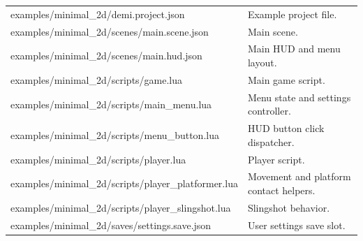 \begin{longtable}{>{\ttfamily\small\raggedright\arraybackslash}p{}p{}}
examples/minimal\_2d/demi.project.json & Example project file. \\
examples/minimal\_2d/scenes/main.scene.json & Main scene. \\
examples/minimal\_2d/scenes/main.hud.json & Main HUD and menu layout. \\
examples/minimal\_2d/scripts/game.lua & Main game script. \\
examples/minimal\_2d/scripts/main\_menu.lua & Menu state and settings controller. \\
examples/minimal\_2d/scripts/menu\_button.lua & HUD button click dispatcher. \\
examples/minimal\_2d/scripts/player.lua & Player script. \\
examples/minimal\_2d/scripts/player\_platformer.lua & Movement and platform contact helpers. \\
examples/minimal\_2d/scripts/player\_slingshot.lua & Slingshot behavior. \\
examples/minimal\_2d/saves/settings.save.json & User settings save slot. \\
\end{longtable}
